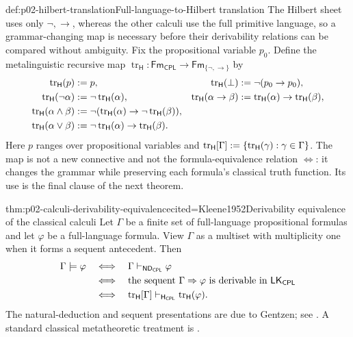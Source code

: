 \begin{hbdefinition}{def:p02-hilbert-translation}{Full-language-to-Hilbert translation}
The Hilbert sheet uses only \(\neg,\to\), whereas the other calculi use the
full primitive language, so a grammar-changing map is necessary before their
derivability relations can be compared without ambiguity.  Fix the
propositional variable \(p_0\).  Define the metalinguistic recursive map
\(\operatorname{tr}_{\mathsf H}:\mathsf{Fm}_{\mathsf{CPL}}\to
\mathsf{Fm}_{\{\neg,\to\}}\) by
\[
\begin{aligned}
 \operatorname{tr}_{\mathsf H}(p)&\mathrel{:=} p,
 &\operatorname{tr}_{\mathsf H}(\bot)&\mathrel{:=}\neg(p_0\to p_0),
 \\
 \operatorname{tr}_{\mathsf H}(\neg\alpha)&\mathrel{:=}
   \neg\operatorname{tr}_{\mathsf H}(\alpha),
 &\operatorname{tr}_{\mathsf H}(\alpha\to\beta)&\mathrel{:=}
   \operatorname{tr}_{\mathsf H}(\alpha)\to
   \operatorname{tr}_{\mathsf H}(\beta),
 \\
 \operatorname{tr}_{\mathsf H}(\alpha\land\beta)&\mathrel{:=}
   \neg(\operatorname{tr}_{\mathsf H}(\alpha)\to
        \neg\operatorname{tr}_{\mathsf H}(\beta)),
 \\
 \operatorname{tr}_{\mathsf H}(\alpha\lor\beta)&\mathrel{:=}
   \neg\operatorname{tr}_{\mathsf H}(\alpha)\to
        \operatorname{tr}_{\mathsf H}(\beta).
\end{aligned}
\]
Here \(p\) ranges over propositional variables and
\(\operatorname{tr}_{\mathsf H}[\Gamma]\mathrel{:=}
\{\operatorname{tr}_{\mathsf H}(\gamma):\gamma\in\Gamma\}\).  The map is not a
new connective and not the formula-equivalence relation \(\Leftrightarrow\):
it changes the grammar while preserving each formula's classical truth
function.  Its use is the final clause of the next theorem.
\end{hbdefinition}

\begin{hbtheorem}{thm:p02-calculi-derivability-equivalence}{cited=Kleene1952}{Derivability equivalence of the classical calculi}
Let \(\Gamma\) be a finite set of full-language propositional formulas and
let \(\varphi\) be a full-language formula.  View \(\Gamma\) as a multiset
with multiplicity one when it forms a sequent antecedent.  Then
\[
\begin{aligned}
 \Gamma\models\varphi
 &\quad\Longleftrightarrow\quad
 \Gamma\vdash_{\mathsf{ND}_{\mathsf{CPL}}}\varphi\\
 &\quad\Longleftrightarrow\quad
 \text{the sequent }\Gamma\Rightarrow\varphi
   \text{ is derivable in }\mathsf{LK}_{\mathsf{CPL}}\\
 &\quad\Longleftrightarrow\quad
 \operatorname{tr}_{\mathsf H}[\Gamma]
   \vdash_{\mathsf H_{\mathsf{CPL}}}
   \operatorname{tr}_{\mathsf H}(\varphi).
\end{aligned}
\]
The natural-deduction and sequent presentations are due to Gentzen; see
\cite{Gentzen1934a}.  A standard classical metatheoretic treatment is
\cite{Kleene1952}.
\end{hbtheorem}

